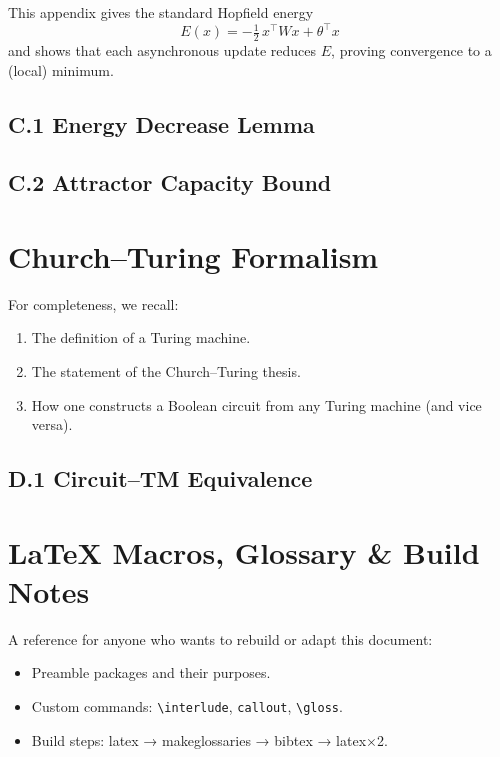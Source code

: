 \documentclass{book}       %
\newcommand{\interlude}[1]{%
  \clearpage
  \begin{center}
    \rule{0.4\linewidth}{0.5pt}\\[6pt]
    \Large\bfseries #1\\[6pt]
    \rule{0.4\linewidth}{0.5pt}
  \end{center}
  \vspace{1em}
}
\newcommand{\gloss}[2][]{%
  \ifthenelse{\equal{#1}{}}%
    {\marginnote{\textbf{#2}}}%
    {\marginnote{\textbf{#1}: #2}}%
}
\begin{document}
This appendix gives the standard Hopfield energy
\[
E(x) = -\tfrac12\,x^\top W x + \theta^\top x
\]
and shows that each asynchronous update reduces $E$, proving
convergence to a (local) minimum.

\section*{C.1  Energy Decrease Lemma}

\section*{C.2  Attractor Capacity Bound}

\chapter{Church–Turing Formalism}
\label{app:ct}

For completeness, we recall:

\begin{enumerate}[noitemsep]
  \item The definition of a Turing machine.  
  \item The statement of the Church–Turing thesis.  
  \item How one constructs a Boolean circuit from any Turing machine (and vice versa).  
\end{enumerate}

\section*{D.1  Circuit–TM Equivalence}

\chapter{LaTeX Macros, Glossary \& Build Notes}
\label{app:macros}

A reference for anyone who wants to rebuild or adapt this document:

\begin{itemize}[noitemsep]
  \item Preamble packages and their purposes.  
  \item Custom commands: \verb|\interlude|, \verb|callout|, \verb|\gloss|.  
  \item Build steps: latex → makeglossaries → bibtex → latex×2.  
\end{itemize}
\end{document}
